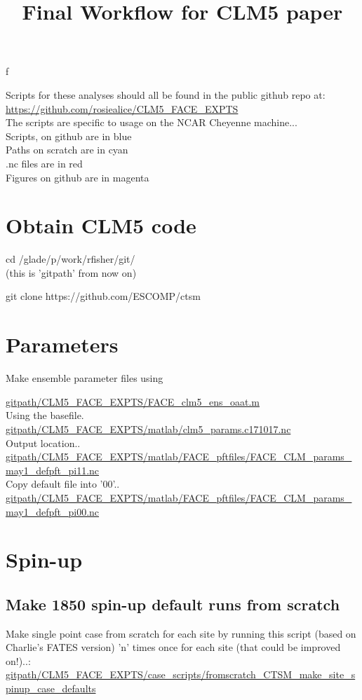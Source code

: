 f \documentclass{article}
\begin{document}
\title{Final Workflow for CLM5 paper}


Scripts for these analyses should all be found in the public github repo at:\\
{\color{blue}\small{\url{https://github.com/rosiealice/CLM5_FACE_EXPTS}}}\\

The scripts are specific to usage on the NCAR Cheyenne machine...\\

{\color{blue} Scripts, on github are in blue}\\
{\color{cyan} Paths on scratch are in cyan}\\
{\color{red}  .nc files are in red}\\
{\color{magenta} Figures on github are in magenta}\\

\section{Obtain CLM5 code}
cd /glade/p/work/rfisher/git/\\
(this is 'gitpath' from now on)

git clone https://github.com/ESCOMP/ctsm 
\section{Parameters}

Make ensemble parameter files using

{\color{blue}\small{\url{gitpath/CLM5_FACE_EXPTS/FACE_clm5_ens_oaat.m}}}\\ 

Using the basefile. \\
{\color{red}\small{\url{gitpath/CLM5_FACE_EXPTS/matlab/clm5_params.c171017.nc}}} \\

Output location..\\
{\color{red}\small{\url{gitpath/CLM5_FACE_EXPTS/matlab/FACE_pftfiles/FACE_CLM_params_may1_defpft_pi11.nc }}} \\

Copy default file into '00'..\\
{\color{red}\small{\url{gitpath/CLM5_FACE_EXPTS/matlab/FACE_pftfiles/FACE_CLM_params_may1_defpft_pi00.nc }}} \\

\section{Spin-up}
\subsection{Make 1850 spin-up default runs from scratch}
Make single point case from scratch for each site by running this script (based on Charlie's FATES version) 'n' times once for each site (that could be improved on!)..:\\
{\color{blue}\small{\url{gitpath/CLM5_FACE_EXPTS/case_scripts/fromscratch_CTSM_make_site_spinup_case_defaults}}}\\
\end{document}
